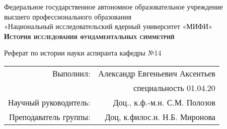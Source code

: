 
\begin{titlepage}
	\begin{center}
		
		{Федеральное государственное автономное образовательное учреждение\\			
			высшего профессионального образования\\		
			«Национальный исследовательский ядерный университет «МИФИ»} \\[2.4cm]
		
		
		
		\textsc{\textbf{История исследования фундаментальных симметрий} \\[2.4cm] }
		
		
	\end{center}
	
	
	\begin{flushright}
		Реферат по истории науки аспиранта кафедры №14
		\begin{tabular}{rr}
			Выполнил: & Александр Евгеньевич Аксентьев \\
			&	специальность 01.04.20 \\					
			Научный руководитель: & Доц., к.ф.-м.н.  С.М. Полозов 	\\
			Преподаватель группы: & Доц, к.филос.н. Н.Б. Миронова
		\end{tabular}
		
	\end{flushright}
	
	\vfill
	
	
	\begin{center}
		\the\year{}
	\end{center}
	
	
	
\end{titlepage}